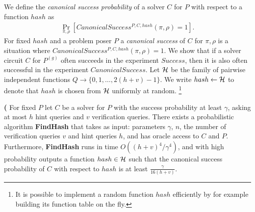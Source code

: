 %
We define the \textit{canonical success probability} of a solver $C$ for $P$ with respect to a function $hash$ as
\begin{align}
 \underset{\pi, \rho}{\Pr}[CanonicalSuccess^{P, C, hash}(\pi, \rho) = 1].
\end{align}
%
For fixed $hash$ and a problem poser $P$ a \textit{canonical success} of $C$ for $\pi, \rho$ is a situation where $CanonicalSuccess^{P, C, hash}(\pi, \rho) = 1$.
We show that if a solver circuit $C$ for $P^{(g)}$ often succeeds in the experiment $Success$, then it is
also often successful in the experiment $CanonicalSuccess$.
Let $\mathcal{H}$ be the family of pairwise independent functions $Q \rightarrow \{0,1, \dots,2(h+v)-1\}$.
We write $hash \leftarrow \mathcal{H}$ to denote that $hash$ is chosen from $\mathcal{H}$ uniformly at random.
\footnote{It is possible to implement a random function $hash$ efficiently by for example building its function table on the fly.}
%
%
\begin{lemma}\textbf{(}
\label{lemma:hash_function_probability}
For fixed $P$ let $C$ be a solver for $P$ with the success probability at least $\gamma$,
asking at most $h$ hint queries and $v$ verification queries.
There exists a probabilistic algorithm \textbf{FindHash} that takes as input:
parameters $\gamma$, $n$, the number of verification queries $v$ and hint queries $h$, and has
oracle access to $C$ and $P$. Furthermore, \textbf{FindHash} runs in time $O((h+v)^4/\gamma^4)$,
and with high probability outputs a function $hash \in \mathcal{H}$
such that the canonical success probability of $C$ with respect to $hash$ is at least $\frac{\gamma}{16(h+v)}$.
\end{lemma}
%
